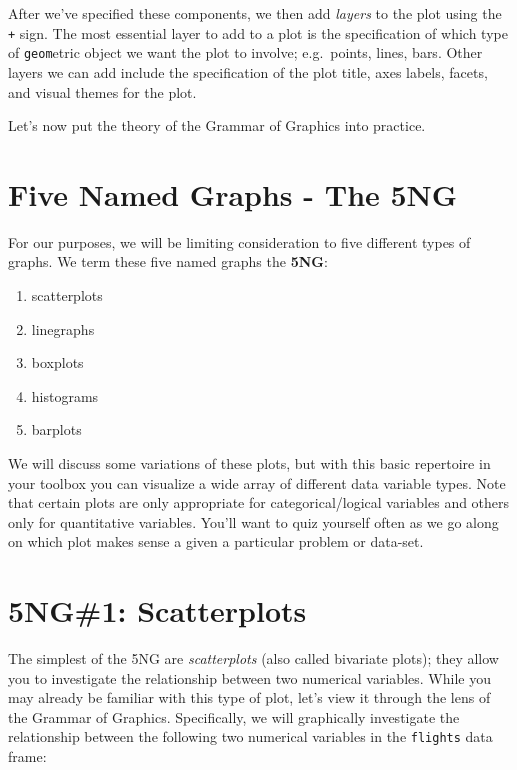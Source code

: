 \documentclass[12pt,]{krantz}
\providecommand{\tightlist}{%
  \setlength{\itemsep}{0pt}\setlength{\parskip}{0pt}}
\begin{document}
After we've specified these components, we then add \emph{layers} to the
plot using the \texttt{+} sign. The most essential layer to add to a
plot is the specification of which type of \texttt{geom}etric object we
want the plot to involve; e.g.~points, lines, bars. Other layers we can
add include the specification of the plot title, axes labels, facets,
and visual themes for the plot.

Let's now put the theory of the Grammar of Graphics into practice.

\section{Five Named Graphs - The 5NG}\label{FiveNG}

For our purposes, we will be limiting consideration to five different
types of graphs. We term these five named graphs the \textbf{5NG}:

\begin{enumerate}
\def\labelenumi{\arabic{enumi}.}
\tightlist
\item
  scatterplots
\item
  linegraphs
\item
  boxplots
\item
  histograms
\item
  barplots
\end{enumerate}

We will discuss some variations of these plots, but with this basic
repertoire in your toolbox you can visualize a wide array of different
data variable types. Note that certain plots are only appropriate for
categorical/logical variables and others only for quantitative
variables. You'll want to quiz yourself often as we go along on which
plot makes sense a given a particular problem or data-set.

\section{5NG\#1: Scatterplots}\label{scatterplots}

The simplest of the 5NG are \emph{scatterplots} (also called bivariate
plots); they allow you to investigate the relationship between two
numerical variables. While you may already be familiar with this type of
plot, let's view it through the lens of the Grammar of Graphics.
Specifically, we will graphically investigate the relationship between
the following two numerical variables in the \texttt{flights} data
frame:
\end{document}
